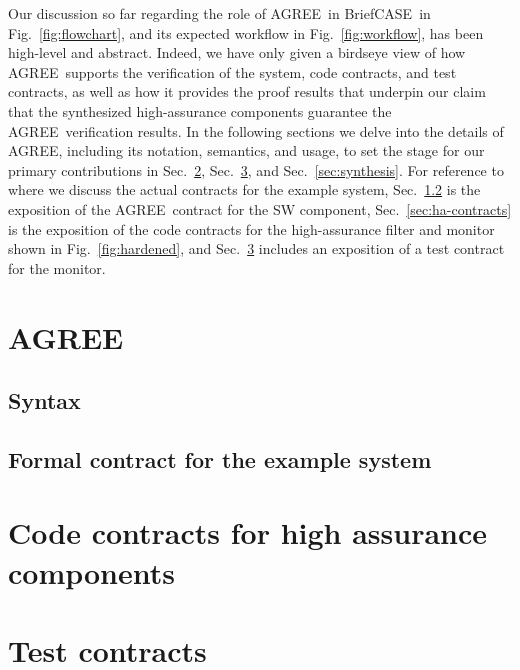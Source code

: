 \documentclass[global,twocolumn]{svjour}
\newcommand{\figref}[1]{Fig.~\ref{#1}}
\newcommand{\secref}[1]{Sec.~\ref{#1}}
\newcommand{\brfcs}{BriefCASE}
\newcommand{\agr}{AGREE}
\begin{document}
Our discussion so far regarding the role of \agr\ in \brfcs\ in \figref{fig:flowchart}, and its expected workflow in \figref{fig:workflow}, has been high-level and abstract.
%
Indeed, we have only given a birdseye view of how \agr\ supports the verification of the system, code contracts, and test contracts, as well as how it provides the proof results that underpin our claim that the synthesized high-assurance components guarantee the \agr\ verification results.
%
In the following sections we delve into the details of \agr, including its notation, semantics, and usage, to set the stage for our primary contributions in \secref{sec:code-contracts}, \secref{sec:testing}, and \secref{sec:synthesis}.
%
For reference to where we discuss the actual contracts for the example system, \secref{sec:sw-contract} is the exposition of the \agr\ contract for the SW component, \secref{sec:ha-contracts} is the exposition of the code contracts for the high-assurance filter and monitor shown in \figref{fig:hardened}, and \secref{sec:testing} includes an exposition of a test contract for the monitor.


\section{\agr}
\label{sec:agree}


\subsection{Syntax}
\label{sec:agree-semantics}


\subsection{Formal contract for the example system}
\label{sec:sw-contract}


\section{Code contracts for high assurance components}
\label{sec:code-contracts}


\section{Test contracts}
\label{sec:testing}

\end{document}

